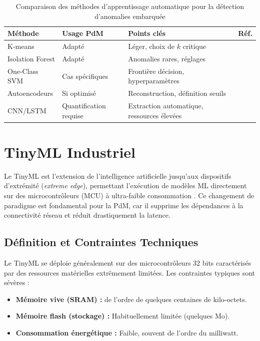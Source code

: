 \begin{table}[ht]
\centering
\caption{Comparaison des méthodes d'apprentissage automatique pour la détection d'anomalies embarquée}
\label{tab:ml_comparison}
\begin{tabular}{llll}
\toprule
\textbf{Méthode} &
\textbf{Usage PdM} &
\textbf{Points clés} &
\textbf{Réf.} \\
\midrule

K-means &
Adapté &
Léger, choix de $k$ critique &
\cite{macqueen1967,chandola2009} \\

Isolation Forest &
Adapté &
Anomalies rares, réglages &
\cite{chandola2009,antonini2023} \\

One-Class SVM &
Cas spécifiques &
Frontière décision, hyperparamètres &
\cite{chandola2009} \\

Autoencodeurs &
Si optimisé &
Reconstruction, définition seuils &
\cite{chandola2009,ran2019} \\

CNN/LSTM &
Quantification requise &
Extraction automatique, ressources élevées &
\cite{langer2025,arciniegas2025} \\

\bottomrule
\end{tabular}
\end{table}


\section{TinyML Industriel}
\label{sec:tinyml_industriel}

Le TinyML est l'extension de l'intelligence artificielle jusqu'aux dispositifs d'extrémité (\textit{extreme edge}), permettant l'exécution de modèles ML directement sur des microcontrôleurs (MCU) à ultra-faible consommation \cite{tsoukas2024,njor2024}. Ce changement de paradigme est fondamental pour la PdM, car il supprime les dépendances à la connectivité réseau et réduit drastiquement la latence.

\subsection{Définition et Contraintes Techniques}

Le TinyML se déploie généralement sur des microcontrôleurs 32 bits caractérisés par des ressources matérielles extrêmement limitées. Les contraintes typiques sont sévères :
\begin{itemize}
\item \textbf{Mémoire vive (SRAM) :} de l'ordre de quelques centaines de kilo-octets.
\item \textbf{Mémoire flash (stockage) :} Habituellement limitée (quelques Mo).
\item \textbf{Consommation énergétique :} Faible, souvent de l'ordre du milliwatt.
\end{itemize}

